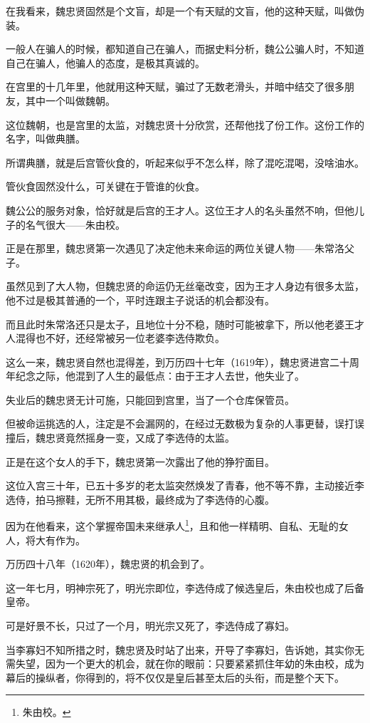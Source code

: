 \begin{multicols}{\theparacolNo}
		在我看来，魏忠贤固然是个文盲，却是一个有天赋的文盲，他的这种天赋，叫做伪装。

		一般人在骗人的时候，都知道自己在骗人，而据史料分析，魏公公骗人时，不知道自己在骗人，他骗人的态度，是极其真诚的。

		在宫里的十几年里，他就用这种天赋，骗过了无数老滑头，并暗中结交了很多朋友，其中一个叫做魏朝。

		这位魏朝，也是宫里的太监，对魏忠贤十分欣赏，还帮他找了份工作。这份工作的名字，叫做典膳。

		所谓典膳，就是后宫管伙食的，听起来似乎不怎么样，除了混吃混喝，没啥油水。

		管伙食固然没什么，可关键在于管谁的伙食。

		魏公公的服务对象，恰好就是后宫的王才人。这位王才人的名头虽然不响，但他儿子的名气很大——朱由校。

		正是在那里，魏忠贤第一次遇见了决定他未来命运的两位关键人物——朱常洛父子。

		虽然见到了大人物，但魏忠贤的命运仍无丝毫改变，因为王才人身边有很多太监，他不过是极其普通的一个，平时连跟主子说话的机会都没有。

		而且此时朱常洛还只是太子，且地位十分不稳，随时可能被拿下，所以他老婆王才人混得也不好，还经常被另一位老婆李选侍欺负。

		这么一来，魏忠贤自然也混得差，到万历四十七年（1619年），魏忠贤进宫二十周年纪念之际，他混到了人生的最低点：由于王才人去世，他失业了。

		失业后的魏忠贤无计可施，只能回到宫里，当了一个仓库保管员。

		但被命运挑选的人，注定是不会漏网的，在经过无数极为复杂的人事更替，误打误撞后，魏忠贤竟然摇身一变，又成了李选侍的太监。

		正是在这个女人的手下，魏忠贤第一次露出了他的狰狞面目。

		这位入宫三十年，已五十多岁的老太监突然焕发了青春，他不等不靠，主动接近李选侍，拍马擦鞋，无所不用其极，最终成为了李选侍的心腹。

		因为在他看来，这个掌握帝国未来继承人\footnote{朱由校。}，且和他一样精明、自私、无耻的女人，将大有作为。

		万历四十八年（1620年），魏忠贤的机会到了。

		这一年七月，明神宗死了，明光宗即位，李选侍成了候选皇后，朱由校也成了后备皇帝。

		可是好景不长，只过了一个月，明光宗又死了，李选侍成了寡妇。

		当李寡妇不知所措之时，魏忠贤及时站了出来，开导了李寡妇，告诉她，其实你无需失望，因为一个更大的机会，就在你的眼前：只要紧紧抓住年幼的朱由校，成为幕后的操纵者，你得到的，将不仅仅是皇后甚至太后的头衔，而是整个天下。


\end{multicols}

